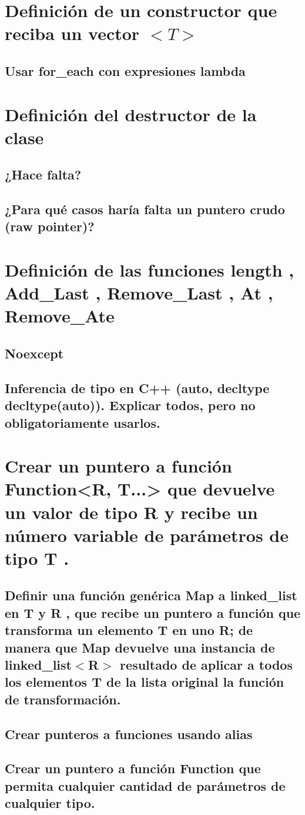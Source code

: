 \documentclass[10pt]{amsart}
\begin{document}
\newpage
\section{Definici\'on de  un constructor que reciba un vector $ <T> $}

\subsection{Usar for\_each con expresiones lambda}

\newpage
\section{Definici\'on del destructor de la clase}

\subsection{¿Hace falta?}

\subsection{¿Para qué casos haría falta un puntero crudo (raw pointer)?}

\newpage
\section{Definici\'on de las funciones length , Add\_Last , Remove\_Last , At , Remove\_Ate}

\subsection{Noexcept}

\subsection{Inferencia de tipo en C++ (auto, decltype decltype(auto)). Explicar todos, pero no obligatoriamente usarlos.}

\newpage
\section{Crear un puntero a función Function<R, T...> que devuelve un valor de tipo R y recibe un número variable de parámetros de tipo T .}

\subsection{Definir una función genérica Map a linked\_list en T y R , que recibe un puntero a función que transforma un elemento T en uno R; de manera que Map devuelve una instancia de linked\_list$ < $R$ > $ resultado de aplicar a todos los elementos T de la lista original la función de transformación.}

\subsection{Crear punteros a funciones usando alias }

\subsection{Crear un puntero a función Function que permita cualquier cantidad de parámetros de cualquier tipo.}
\end{document}
